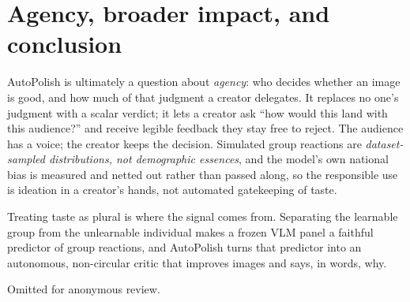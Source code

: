 \documentclass{article}
\begin{document}
\section{Agency, broader impact, and conclusion}

AutoPolish is ultimately a question about \emph{agency}: who decides whether an image is good, and how much of that judgment a creator delegates. It replaces no one's judgment with a scalar verdict; it lets a creator ask ``how would this land with this audience?'' and receive legible feedback they stay free to reject. The audience has a voice; the creator keeps the decision. Simulated group reactions are \emph{dataset-sampled distributions, not demographic essences}, and the model's own national bias is measured and netted out rather than passed along, so the responsible use is ideation in a creator's hands, not automated gatekeeping of taste.

Treating taste as plural is where the signal comes from. Separating the learnable group from the unlearnable individual makes a frozen VLM panel a faithful predictor of group reactions, and AutoPolish turns that predictor into an autonomous, non-circular critic that improves images and says, in words, why.


\begin{ack}
Omitted for anonymous review.
\end{ack}
\end{document}
